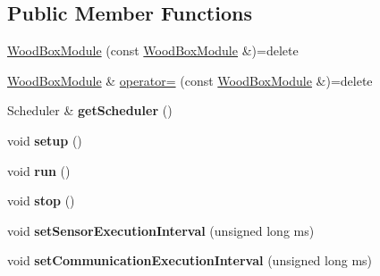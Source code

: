 \subsection*{Public Member Functions}
\begin{DoxyCompactItemize}
\item 
\mbox{\hyperlink{classwood_box_1_1module_1_1_wood_box_module_ade3d82ff1e508da2ad37185c208f9333}{Wood\+Box\+Module}} (const \mbox{\hyperlink{classwood_box_1_1module_1_1_wood_box_module}{Wood\+Box\+Module}} \&)=delete
\item 
\mbox{\hyperlink{classwood_box_1_1module_1_1_wood_box_module}{Wood\+Box\+Module}} \& \mbox{\hyperlink{classwood_box_1_1module_1_1_wood_box_module_acdae18f8e9e685cdbce5a4fc99956ab3}{operator=}} (const \mbox{\hyperlink{classwood_box_1_1module_1_1_wood_box_module}{Wood\+Box\+Module}} \&)=delete
\item 
\mbox{\label{classwood_box_1_1module_1_1_wood_box_module_a24b14dd95e7b1c5a7ba31107cd0c524d}} 
Scheduler \& {\bfseries get\+Scheduler} ()
\item 
\mbox{\label{classwood_box_1_1module_1_1_wood_box_module_a610b2339bd0ff26d2cde59d2006a4aed}} 
void {\bfseries setup} ()
\item 
\mbox{\label{classwood_box_1_1module_1_1_wood_box_module_ac65e58ab2338b1e3f57e4ce5d9e70c6c}} 
void {\bfseries run} ()
\item 
\mbox{\label{classwood_box_1_1module_1_1_wood_box_module_abbc32e89fe1ace40f447539237c0b713}} 
void {\bfseries stop} ()
\item 
\mbox{\label{classwood_box_1_1module_1_1_wood_box_module_aa5e44c8631ee30e85c16ffc0454c8210}} 
void {\bfseries set\+Sensor\+Execution\+Interval} (unsigned long ms)
\item 
\mbox{\label{classwood_box_1_1module_1_1_wood_box_module_a0242f49765460d7c1e0528260ba1c26e}} 
void {\bfseries set\+Communication\+Execution\+Interval} (unsigned long ms)
\item 
\mbox{\label{classwood_box_1_1module_1_1_wood_box_module_ada9e2ee4b4da9396c504c0d0217d0c2f}} 

\end{DoxyCompactItemize}
